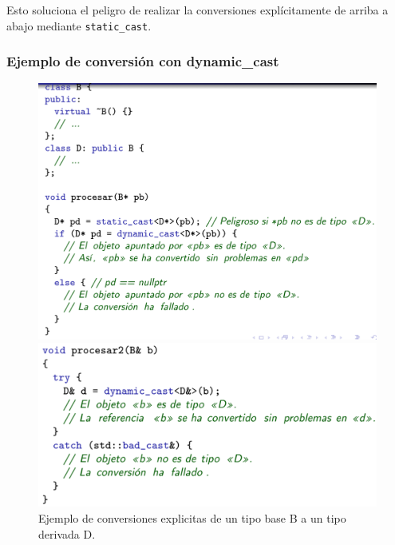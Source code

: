 Esto soluciona el peligro de realizar la conversiones explícitamente de arriba a abajo mediante \texttt{static\_cast}.

\subsubsection{Ejemplo de conversión con dynamic\_cast}

\begin{figure}[h]
	\begin{minipage}{0.5\textwidth}
		\includegraphics[width=\textwidth]{Imagenes/poli9.png}
	\end{minipage}
\hfill
	\begin{minipage}{0.5\textwidth}
		\vspace{-2cm}
		\includegraphics[width=\textwidth]{Imagenes/poli10.png}	
	\end{minipage}
\caption{Ejemplo de conversiones explicitas de un tipo base B a un tipo derivada D.}
\end{figure}

